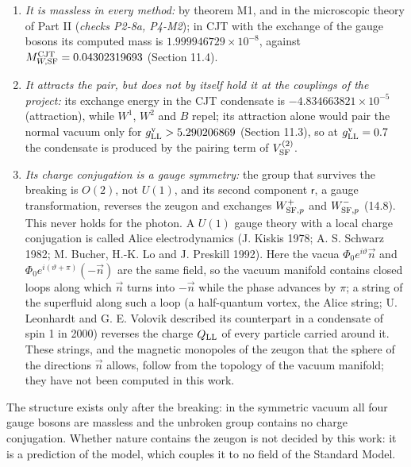 \documentclass[
  10pt,
]{article}
\providecommand{\tightlist}{%
  \setlength{\itemsep}{0pt}\setlength{\parskip}{0pt}}
\begin{document}
\begin{enumerate}
\def\labelenumi{\arabic{enumi}.}
\tightlist
\item
  \emph{It is massless in every method:} by theorem M1, and in the
  microscopic theory of Part II (\emph{checks P2-8a, P4-M2}); in CJT
  with the exchange of the gauge bosons its computed mass is
  \(1.999946729\times10^{-8}\), against
  \(M^{\rm CJT}_{W,{\rm SF}}=0.04302319693\) (Section 11.4).
\item
  \emph{It attracts the pair, but does not by itself hold it at the
  couplings of the project:} its exchange energy in the CJT condensate
  is \(-4.834663821\times10^{-5}\) (attraction), while \(W^1\), \(W^2\)
  and \(B\) repel; its attraction alone would pair the normal vacuum
  only for \(g^{\rm v}_{\rm LL}>5.290206869\) (Section 11.3), so at
  \(g^{\rm v}_{\rm LL}=0.7\) the condensate is produced by the pairing
  term of \(V^{(2)}_{\rm SF}\).
\item
  \emph{Its charge conjugation is a gauge symmetry:} the group that
  survives the breaking is \(O(2)\), not \(U(1)\), and its second
  component \(\mathsf r\), a gauge transformation, reverses the zeugon
  and exchanges \(W^+_{{\rm SF},p}\) and \(W^-_{{\rm SF},p}\) (14.8).
  This never holds for the photon. A \(U(1)\) gauge theory with a local
  charge conjugation is called Alice electrodynamics (J. Kiskis 1978; A.
  S. Schwarz 1982; M. Bucher, H.-K. Lo and J. Preskill 1992). Here the
  vacua \(\Phi_0e^{i\vartheta}\vec n\) and
  \(\Phi_0e^{i(\vartheta+\pi)}(-\vec n)\) are the same field, so the
  vacuum manifold contains closed loops along which \(\vec n\) turns
  into \(-\vec n\) while the phase advances by \(\pi\); a string of the
  superfluid along such a loop (a half-quantum vortex, the Alice string;
  U. Leonhardt and G. E. Volovik described its counterpart in a
  condensate of spin 1 in 2000) reverses the charge \(Q_{\rm LL}\) of
  every particle carried around it. These strings, and the magnetic
  monopoles of the zeugon that the sphere of the directions \(\vec n\)
  allows, follow from the topology of the vacuum manifold; they have not
  been computed in this work.
\end{enumerate}

The structure exists only after the breaking: in the symmetric vacuum
all four gauge bosons are massless and the unbroken group contains no
charge conjugation. Whether nature contains the zeugon is not decided by
this work: it is a prediction of the model, which couples it to no field
of the Standard Model.
\end{document}
